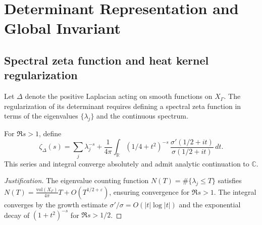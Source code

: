 
\section{Determinant Representation and Global Invariant}
\label{sec:ch4-part6-determinant-representation}
\relax \hspace{0pt}

\subsection{Spectral zeta function and heat kernel regularization}
\label{subsec:ch4-part6-zeta-function}
\relax

Let $\Delta$ denote the positive Laplacian acting on smooth functions on $X_\Gamma$.  
The regularization of its determinant requires defining a spectral zeta function in terms of the eigenvalues $\{\lambda_j\}$ and the continuous spectrum.

\begin{definition}
\label{def:spectral-zeta}
For $\Re s>1$, define
\[
\zeta_\Delta(s)
= \sum_j \lambda_j^{-s}
+ \frac{1}{4\pi}\int_{\mathbb{R}} (1/4+t^2)^{-s}\,\frac{\sigma'(1/2+it)}{\sigma(1/2+it)}\,dt.
\]
This series and integral converge absolutely and admit analytic continuation to $\mathbb{C}$.
\end{definition}

\begin{proof}[Justification]
The eigenvalue counting function $N(T)=\#\{\lambda_j\le T\}$ satisfies $N(T)=\frac{\mathrm{vol}(X_\Gamma)}{4\pi}T+O(T^{1/2+\varepsilon})$, ensuring convergence for $\Re s>1$.  
The integral converges by the growth estimate $\sigma'/\sigma=O(|t|\log|t|)$ and the exponential decay of $(1+t^2)^{-s}$ for $\Re s>1/2$.
\end{proof}

